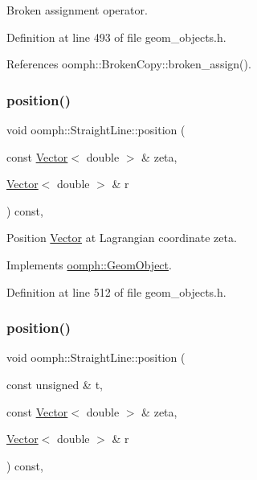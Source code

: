 Broken assignment operator. 



Definition at line 493 of file geom\+\_\+objects.\+h.



References oomph\+::\+Broken\+Copy\+::broken\+\_\+assign().

\mbox{\label{classoomph_1_1StraightLine_a96aedd167e5529eb7db60a63efad5884}} 
\subsubsection{\texorpdfstring{position()}{position()}\hspace{0.1cm}{\footnotesize\ttfamily [1/2]}}
{\footnotesize\ttfamily void oomph\+::\+Straight\+Line\+::position (\begin{DoxyParamCaption}\item[{const \hyperlink{classoomph_1_1Vector}{Vector}$<$ double $>$ \&}]{zeta,  }\item[{\hyperlink{classoomph_1_1Vector}{Vector}$<$ double $>$ \&}]{r }\end{DoxyParamCaption}) const\hspace{0.3cm}{\ttfamily [inline]}, {\ttfamily [virtual]}}



Position \hyperlink{classoomph_1_1Vector}{Vector} at Lagrangian coordinate zeta. 



Implements \hyperlink{classoomph_1_1GeomObject_a0d04c9d4667817f3ef24bb660fd56065}{oomph\+::\+Geom\+Object}.



Definition at line 512 of file geom\+\_\+objects.\+h.

\mbox{\label{classoomph_1_1StraightLine_adfa84ac4d8342089f0f69eb2efe1108f}} 
\subsubsection{\texorpdfstring{position()}{position()}\hspace{0.1cm}{\footnotesize\ttfamily [2/2]}}
{\footnotesize\ttfamily void oomph\+::\+Straight\+Line\+::position (\begin{DoxyParamCaption}\item[{const unsigned \&}]{t,  }\item[{const \hyperlink{classoomph_1_1Vector}{Vector}$<$ double $>$ \&}]{zeta,  }\item[{\hyperlink{classoomph_1_1Vector}{Vector}$<$ double $>$ \&}]{r }\end{DoxyParamCaption}) const\hspace{0.3cm}{\ttfamily [inline]}, {\ttfamily [virtual]}}



